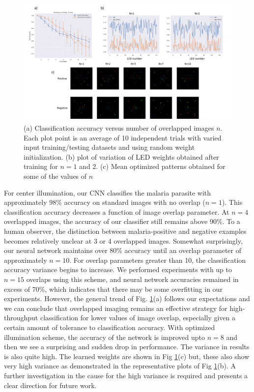 \documentclass{article}
\begin{document}
\begin{figure}
\centering
\includegraphics[width=\linewidth]{590L3.pdf}
\caption{(a) Classification accuracy versus number of overlapped images $n$. Each plot point is an average of 10 independent trials with varied input training/testing datasets and using random weight initialization. (b) plot of variation of LED weights obtained after training for $n=1$ and 2. (c) Mean optimized patterns obtained for some of the values of $n$}
\label{overlapgraph}
\end{figure}

For center illumination, our CNN classifies the malaria parasite with approximately 98\% accuracy on standard images with no overlap ($n=1$). This classification accuracy decreases a function of image overlap parameter. At $n=4$ overlapped images, the accuracy of our classifier still remains above 90\%. To a human observer, the distinction between malaria-positive and negative examples becomes relatively unclear at 3 or 4 overlapped images. Somewhat surprisingly, our neural network maintains over 80\% accuracy until an overlap parameter of approximately $n=10$. For overlap parameters greater than 10, the classification accuracy variance begins to increase. We performed experiments with up to $n=15$ overlaps using this scheme, and neural network accuracies remained in excess of 70\%, which indicates that there may be some overfitting in our experiments. However, the general trend of Fig. \ref{overlapgraph}(a) follows our expectations and we can conclude that overlapped imaging remains an effective strategy for high-throughput classification for lower values of image overlap, especially given a certain amount of tolerance to classification accuracy. With optimized illumination scheme, the accuracy of the network is improved upto $n=8$ and then we see a surprising and sudden drop in performance. The variance in results is also quite high. The learned weights are shown in Fig \ref{overlapgraph}(c) but, these also show very high variance as demonstrated in the representative plots of Fig \ref{overlapgraph}(b). A further investigation in the cause for the high variance is required and presents a clear direction for future work.
\end{document}

